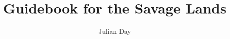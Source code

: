 \documentclass{article}
\begin{document}
\title{Guidebook for the Savage Lands}
\author{Julian Day}
\maketitle
\thispagestyle{empty}

\newpage
\clearpage
\thispagestyle{empty}

\tableofcontents

\newpage
\setcounter{page}{1}





\end{document}
